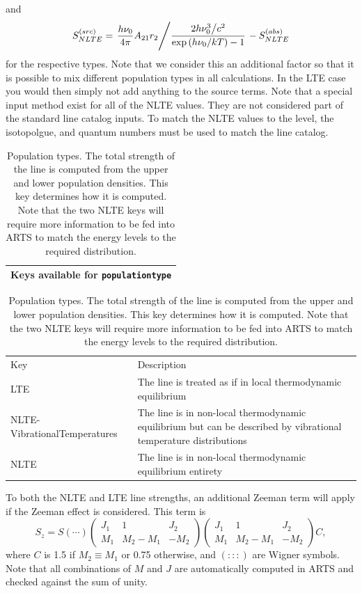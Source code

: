 and
\begin{equation}
  S^{(src)}_{NLTE} =  \left.\frac{h\nu_0}{4\pi}A_{21}r_2\middle/{\frac{\left.{2h\nu_0^3}\middle/{c^2}\right.}{\exp\left(h\nu_0\middle/kT\right) - 1}}\right. - S^{(abs)}_{NLTE}
\end{equation}
for the respective types.  Note that we consider this an additional factor so
that it is possible to mix different population types in all calculations.
In the LTE case you would then simply not add anything to the source terms.
Note that a special input method exist for all of the NLTE values.  They are not considered part
of the standard line catalog inputs.  To match the NLTE values to the level, the isotopolgue, 
and quantum numbers must be used to match the line catalog.

\begin{table}[ht!]
 \centering
 \begin{tabular}{c}
  Keys available for \verb|populationtype|\\\hline
 \end{tabular}
 \begin{tabular}{lp{6cm}}
  Key&Description\\
  LTE&The line is treated as if in local thermodynamic equilibrium\\
  NLTE-VibrationalTemperatures&The line is in non-local thermodynamic equilibrium but can be described by vibrational temperature distributions\\
  NLTE& The line is in non-local thermodynamic equilibrium entirety
 \end{tabular}
 \caption{Population types.  The total strength of the line is computed from the upper and lower population densities.
 This key determines how it is computed.  Note that the two NLTE keys will require more information to be fed into ARTS
 to match the energy levels to the required distribution.}
 \label{tab:abs_theory:lineshape:populationtype}
\end{table}

To both the NLTE and LTE line strengths, an additional Zeeman term will apply if
the Zeeman effect is considered.  This term is
\begin{equation}
 S_z = S(\cdots)  \left(
 \begin{array}{ccc}
 J_1 & 1 & J_2 \\ 
 M_1 & M_2-M_1 & -M_2
 \end{array} \right) \left(
 \begin{array}{ccc}
 J_1 & 1 & J_2 \\ 
 M_1 & M_2-M_1 & -M_2
 \end{array} \right) C,
 \end{equation}
where $C$ is 1.5 if $M_2\equiv M_1$ or 0.75 otherwise, and $(:::)$ are Wigner symbols.
Note that all combinations of $M$ and $J$ are automatically computed in ARTS and checked
against the sum of unity.

